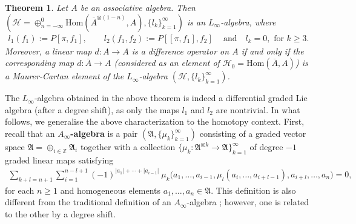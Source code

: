 \documentclass[a4paper,reqno,10pt]{amsart}
\theoremstyle{plain}
\newtheorem{thm}{Theorem}[section]
\theoremstyle{definition}
\theoremstyle{remark}
\begin{document}
\begin{thm}\label{mc-gla}
   Let $A$ be an associative algebra. Then $ (\mathcal{H} =  \oplus_{n= - \infty}^0 \mathrm{Hom} ( \overline{A}^{\otimes (1-n)}, A ) , \{ l_k \}_{k=1}^\infty)$ is an $L_\infty$-algebra, where
    \begin{align*}
        l_1 (f_1) := P [\pi, f_1], \qquad
        l_2 (f_1, f_2) := P [[ \pi, f_1], f_2] ~ \quad \text{and} \quad
        l_k =0, \text{ for } k \geq 3.
    \end{align*}
    Moreover, a linear map $d: A \rightarrow A$ is a difference operator on $A$ if and only if the corresponding map $d: \overline{A} \rightarrow A$ (considered as an element of $\mathcal{H}_0 = \mathrm{Hom} (\overline{A}, A)$) is a Maurer-Cartan element of the $L_\infty$-algebra $ (\mathcal{H} , \{ l_k \}_{k=1}^\infty)$.
\end{thm}

The $L_\infty$-algebra obtained in the above theorem is indeed a differential graded Lie algebra (after a degree shift), as only the maps $l_1$ and $l_2$ are nontrivial. In what follows, we generalise the above characterization to the homotopy context. First, recall that an {\bf $A_\infty$-algebra} is a pair $(\mathfrak{A}, \{ \mu_k \}_{k=1}^\infty)$ consisting of a graded vector space $\mathfrak{A} = \oplus_{i \in \mathbb{Z}} \mathfrak{A}_i$ together with a collection $\{ \mu_k : \mathfrak{A}^{\otimes k} \rightarrow \mathfrak{A} \}_{k=1}^\infty$ of degree $-1$ graded linear maps satisfying 
    \begin{align*}
        \sum_{k+l = n+1} \sum_{i=1}^{n-l+1} (-1)^{ |a_1| + \cdots + |a_{i-1}|} ~ \! \mu_k \big(  a_1, \ldots, a_{i-1} , \mu_l (a_i, \ldots, a_{i+l-1}), a_{i+l} , \ldots, a_n \big) =0,
    \end{align*}
    for each $n \geq 1$ and homogeneous elements $a_1, \ldots, a_n \in \mathfrak{A}$. This definition is also different from the traditional definition of an $A_\infty$-algebra \cite{keller,lada-markl}; however, one is related to the other by a degree shift.

    \medskip
\end{document}

